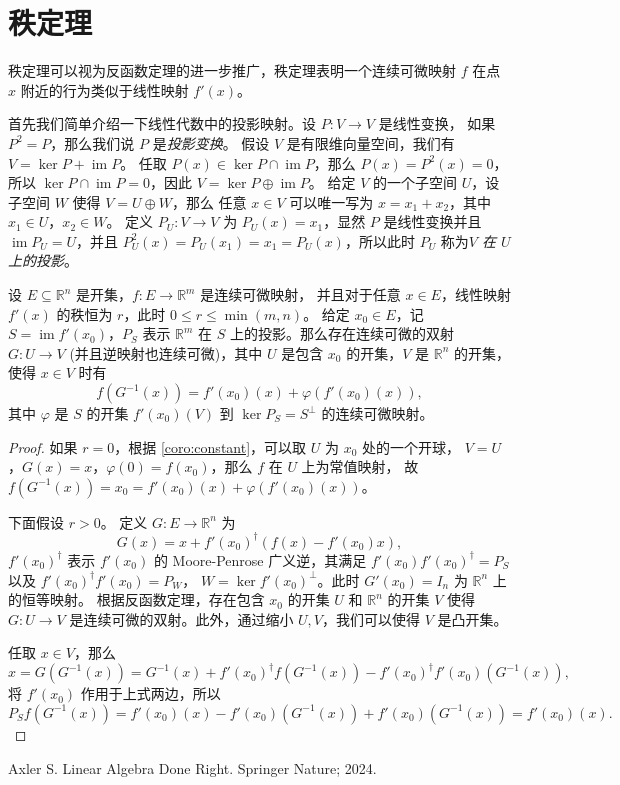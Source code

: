 \documentclass[fontset=none,zihao=-4]{Notes}
\DeclareMathOperator\im{im}
\begin{document}
\section{秩定理}

秩定理可以视为反函数定理的进一步推广，秩定理表明一个连续可微映射 $f$
在点 $x$ 附近的行为类似于线性映射 $f'(x)$。

首先我们简单介绍一下线性代数中的投影映射。设 $P:V\to V$ 是线性变换，
如果 $P^2=P$，那么我们说 $P$ 是\emph{投影变换}。
假设 $V$ 是有限维向量空间，我们有 $V=\ker P+\im P$。
任取 $P(x)\in\ker P \cap\im P$，那么
$P(x)=P^2(x)=0$，所以 $\ker P\cap\im P=0$，因此 $V=\ker P\oplus\im P$。
给定 $V$ 的一个子空间 $U$，设子空间 $W$ 使得 $V=U\oplus W$，那么
任意 $x\in V$ 可以唯一写为 $x=x_1+x_2$，其中 $x_1\in U$，$x_2\in W$。
定义 $P_U:V\to V$ 为 $P_U(x)=x_1$，显然 $P$ 是线性变换并且 $\im P_U=U$，并且
$P_U^2(x)=P_U(x_1)=x_1=P_U(x)$，所以此时 $P_U$ 称为\emph{$V$ 在 $U$ 上的投影}。

\begin{theorem}[秩定理]
  设 $E\subseteq\mathbb{R}^n$ 是开集，$f:E\to\mathbb{R}^m$ 是连续可微映射，
  并且对于任意 $x\in E$，线性映射 $f'(x)$ 的秩恒为 $r$，此时 $0\leq r\leq \min(m,n)$。
  给定 $x_0\in E$，记 $S=\im f'(x_0)$，$P_{S}$ 表示 $\mathbb{R}^m$ 在 $S$
  上的投影。那么存在连续可微的双射 $G:U\to V$ (并且逆映射也连续可微)，其中 $U$ 是包含 $x_0$
  的开集，$V$ 是 $\mathbb{R}^n$ 的开集，使得 $x\in V$ 时有
  \[
    f(G^{-1}(x))=f'(x_0)(x)+ \varphi(f'(x_0)(x)),
  \]
  其中 $\varphi$ 是 $S$ 的开集 $f'(x_0)(V)$ 到 $\ker P_S=S^\bot$ 的连续可微映射。
\end{theorem}
\begin{proof}
  如果 $r=0$，根据 \autoref{coro:constant}，可以取 $U$ 为 $x_0$ 处的一个开球，
  $V=U$，$G(x)=x$，$\varphi(0)=f(x_0)$，那么 $f$ 在 $U$ 上为常值映射，
  故 $f(G^{-1}(x))=x_0=f'(x_0)(x)+\varphi(f'(x_0)(x))$。

  下面假设 $r>0$。
  定义 $G:E\to\mathbb{R}^n$ 为
  \[
    G(x)=x+f'(x_0)^\dagger (f(x)-f'(x_0)x),
  \]
  $f'(x_0)^\dagger$ 表示 $f'(x_0)$ 的 Moore-Penrose 广义逆，其满足
  $f'(x_0)f'(x_0)^\dagger=P_S$ 以及 $f'(x_0)^\dagger f'(x_0)=P_W$，
  $W=\ker f'(x_0)^\bot$。此时 $G'(x_0)=I_n$ 为 $\mathbb{R}^n$ 上的恒等映射。
  根据反函数定理，存在包含 $x_0$ 的开集 $U$ 和 $\mathbb{R}^n$ 的开集 $V$
  使得 $G:U\to V$ 是连续可微的双射。此外，通过缩小 $U,V$，我们可以使得
  $V$ 是凸开集。

  任取 $x\in V$，那么
  \[
    x=G(G^{-1}(x))=G^{-1}(x)+f'(x_0)^\dagger f(G^{-1}(x))-f'(x_0)^\dagger f'(x_0)(G^{-1}(x)),  
  \]
  将 $f'(x_0)$ 作用于上式两边，所以
  \[
    P_Sf(G^{-1}(x))=f'(x_0)(x)-f'(x_0)(G^{-1}(x))+f'(x_0)(G^{-1}(x))=f'(x_0)(x).
  \]
\end{proof}










\begin{thebibliography}{99}
    Axler S. Linear Algebra Done Right. Springer Nature; 2024.
\end{thebibliography}
\end{document}
